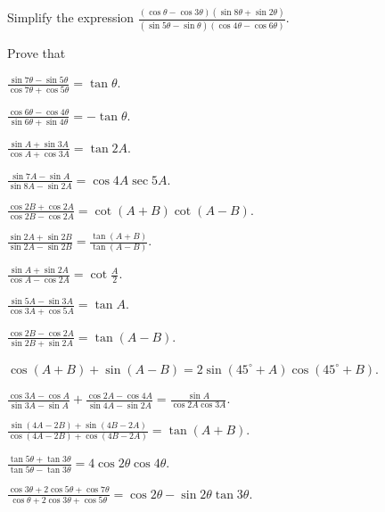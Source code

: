 \item Simplify the expression $\frac{(\cos \theta - \cos 3\theta)(\sin 8\theta + \sin 2\theta)}{(\sin 5\theta - \sin\theta)(\cos
    4\theta - \cos 6\theta)}$.
\stopitemize

Prove that


\item $\frac{\sin7\theta - \sin5\theta}{\cos7\theta + \cos5\theta} = \tan\theta$.

\item $\frac{\cos6\theta - \cos4\theta}{\sin6\theta + \sin4\theta} = -\tan\theta$.

\item $\frac{\sin A + \sin 3A}{\cos A + \cos 3A} = \tan 2A$.

\item $\frac{\sin 7A - \sin A}{\sin 8A - \sin 2A} = \cos 4A\sec 5A$.

\item $\frac{\cos 2B + \cos 2A}{\cos 2B - \cos 2A} = \cot(A + B)\cot(A - B)$.

\item $\frac{\sin 2A + \sin 2B}{\sin 2A - \sin 2B} = \frac{\tan(A + B)}{\tan(A - B)}$.

\item $\frac{\sin A + \sin 2A}{\cos A - \cos 2A} = \cot \frac{A}{2}$.

\item $\frac{\sin 5A - \sin 3A}{\cos 3A + \cos 5A} = \tan A$.

\item $\frac{\cos 2B - \cos 2A}{\sin 2B + \sin 2A} = \tan(A - B)$.

\item $\cos (A + B) + \sin(A - B) = 2\sin(45^\circ + A)\cos(45^\circ + B)$.

\item $\frac{\cos 3A - \cos A}{\sin 3A - \sin A} + \frac{\cos 2A - \cos 4A}{\sin 4A - \sin 2A} = \frac{\sin A}{\cos 2A\cos 3A}$.

\item $\frac{\sin (4A - 2B) + \sin (4B - 2A)}{\cos (4A - 2B) + \cos (4B - 2A)} = \tan(A + B)$.

\item $\frac{\tan 5\theta + \tan 3\theta}{\tan 5\theta - \tan 3\theta} = 4\cos 2\theta\cos 4\theta$.

\item $\frac{\cos 3\theta + 2\cos5\theta + \cos 7\theta}{\cos\theta + 2\cos3\theta + \cos 5\theta} = \cos 2\theta - \sin
    2\theta\tan 3\theta$.

